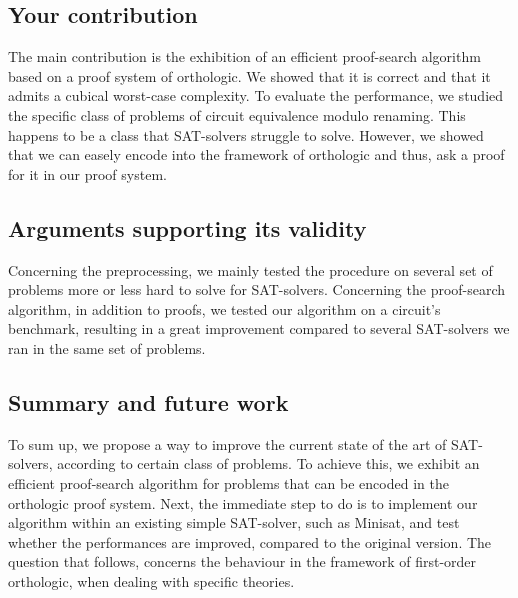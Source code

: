 \documentclass[a4paper, 11pt]{article}
\begin{document}
	\subsection*{Your contribution}

	The main contribution is the exhibition of an efficient proof-search algorithm based on a
	proof system of orthologic. We showed that it is correct and that it admits a cubical worst-case
	complexity. To evaluate the performance, we studied the specific class of problems of circuit
	equivalence modulo renaming. This happens to be a class that SAT-solvers struggle to solve.
	However, we showed that we can easely encode into the framework of orthologic and thus, ask
	a proof for it in our proof system.



	\subsection*{Arguments supporting its validity}

	Concerning the preprocessing, we mainly tested the procedure on several set of problems more or
	less hard to solve for SAT-solvers. Concerning the proof-search algorithm, in addition to proofs,
	we tested our algorithm on a circuit's benchmark, resulting in a great improvement compared to 
	several SAT-solvers we ran in the same set of problems.



	\subsection*{Summary and future work}

	To sum up, we propose a way to improve the current state of the art of SAT-solvers, according to
	certain class of problems. To achieve this, we exhibit an efficient proof-search algorithm for 
	problems that can be encoded in the orthologic proof system. Next, the immediate step to do is
	to implement our algorithm within an existing simple SAT-solver, such as Minisat, and test
	whether the performances are improved, compared to the original version. The question that
	follows, concerns the behaviour in the framework of first-order orthologic, when dealing
	with specific theories.
\end{document}
